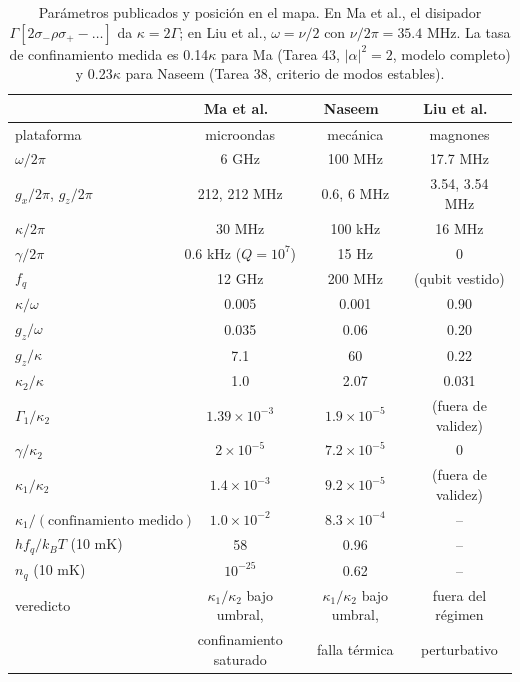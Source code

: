 \documentclass[11pt]{report}
\begin{document}
\begin{table}[h]
\centering
\small
\begin{tabular}{lccc}
\toprule
 & Ma et al.~\cite{Ma2019} & Naseem~\cite{Naseem2026} & Liu et al.~\cite{Liu2025}\\
\midrule
plataforma & microondas & mec\'anica & magnones\\
$\omega/2\pi$ & 6 GHz & 100 MHz & 17.7 MHz\\
$g_{x}/2\pi$, $g_{z}/2\pi$ & 212, 212 MHz & 0.6, 6 MHz & 3.54, 3.54 MHz\\
$\kappa/2\pi$ & 30 MHz & 100 kHz & 16 MHz\\
$\gamma/2\pi$ & 0.6 kHz ($Q=10^{7}$) & 15 Hz & 0\\
$f_{q}$ & 12 GHz & 200 MHz & (qubit vestido)\\
\midrule
$\kappa/\omega$ & 0.005 & 0.001 & 0.90\\
$g_{z}/\omega$ & 0.035 & 0.06 & 0.20\\
$g_{z}/\kappa$ & 7.1 & 60 & 0.22\\
$\kappa_{2}/\kappa$ & 1.0 & 2.07 & 0.031\\
$\Gamma_{1}/\kappa_{2}$ & $1.39\times10^{-3}$ & $1.9\times10^{-5}$ & (fuera de validez)\\
$\gamma/\kappa_{2}$ & $2\times10^{-5}$ & $7.2\times10^{-5}$ & 0\\
$\kappa_{1}/\kappa_{2}$ & $1.4\times10^{-3}$ & $9.2\times10^{-5}$ & (fuera de validez)\\
$\kappa_{1}/(\text{confinamiento medido})$ & $1.0\times10^{-2}$ & $8.3\times10^{-4}$ & --\\
$hf_{q}/k_{B}T$ (10 mK) & 58 & 0.96 & --\\
$n_{q}$ (10 mK) & $10^{-25}$ & 0.62 & --\\
\midrule
veredicto & $\kappa_{1}/\kappa_{2}$ bajo umbral, & $\kappa_{1}/\kappa_{2}$ bajo umbral, & fuera del r\'egimen\\
 & confinamiento saturado & falla t\'ermica & perturbativo\\
\bottomrule
\end{tabular}
\caption{Par\'ametros publicados y posici\'on en el mapa. En Ma et al., el disipador $\Gamma[2\sigma_{-}\rho\sigma_{+}-\ldots]$ da $\kappa=2\Gamma$; en Liu et al., $\omega=\nu/2$ con $\nu/2\pi=35.4$ MHz. La tasa de confinamiento medida es 0.14$\kappa$ para Ma (Tarea 43, $|\alpha|^{2}=2$, modelo completo) y 0.23$\kappa$ para Naseem (Tarea 38, criterio de modos estables).}
\label{tab:plataformas}
\end{table}
\end{document}
